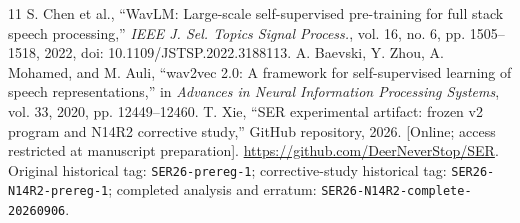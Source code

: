\documentclass[letterpaper]{article}
\begin{document}
\begin{thebibliography}{11}
 S. Chen et al., ``WavLM: Large-scale self-supervised pre-training for full stack speech processing,'' \emph{IEEE J. Sel. Topics Signal Process.}, vol. 16, no. 6, pp. 1505--1518, 2022, doi: 10.1109/JSTSP.2022.3188113.
 A. Baevski, Y. Zhou, A. Mohamed, and M. Auli, ``wav2vec 2.0: A framework for self-supervised learning of speech representations,'' in \emph{Advances in Neural Information Processing Systems}, vol. 33, 2020, pp. 12449--12460.
 T. Xie, ``SER experimental artifact: frozen v2 program and N14R2 corrective study,'' GitHub repository, 2026. [Online; access restricted at manuscript preparation]. \url{https://github.com/DeerNeverStop/SER}. Original historical tag: \texttt{SER26-prereg-1}; corrective-study historical tag: \texttt{SER26-N14R2-prereg-1}; completed analysis and erratum: \texttt{SER26-N14R2-complete-20260906}.
\end{thebibliography}
\end{document}
